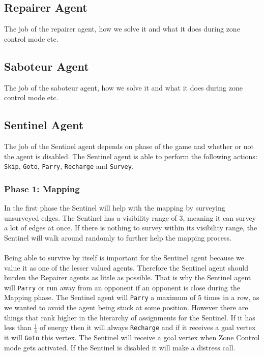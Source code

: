 \documentclass[11pt]{article}
\begin{document}
\subsection{Repairer Agent}
The job of the repairer agent, how we solve it and what it does during zone control mode etc.

\subsection{Saboteur Agent}
The job of the saboteur agent, how we solve it and what it does during zone control mode etc.

\subsection{Sentinel Agent}
The job of the Sentinel agent depends on phase of the game and whether or not the agent is disabled. The Sentinel agent is able to perform the following actions: {\tt Skip}, {\tt Goto}, {\tt Parry}, {\tt Recharge} and {\tt Survey}.

\subsubsection*{Phase 1: Mapping}
In the first phase the Sentinel will help with the mapping by surveying unsurveyed edges. The Sentinel has a visibility range of 3, meaning it can survey a lot of edges at once. If there is nothing to survey within its visibility range, the Sentinel will walk around randomly to further help the mapping process.\\
\\
Being able to survive by itself is important for the Sentinel agent because we value it as one of the lesser valued agents. Therefore the Sentinel agent should burden the Repairer agents as little as possible. That is why the Sentinel agent will {\tt Parry} or run away from an opponent if an opponent is close during the Mapping phase. The Sentinel agent will {\tt Parry} a maximum of 5 times in a row, as we wanted to avoid the agent being stuck at some position. However there are things that rank higher in the hierarchy of assignments for the Sentinel. If it has less than $\frac{1}{4}$ of energy then it will always {\tt Recharge} and if it receives a goal vertex it will {\tt Goto} this vertex. The Sentinel will receive a goal vertex when Zone Control mode gets activated. If the Sentinel is disabled it will make a distress call.
 
\end{document}
